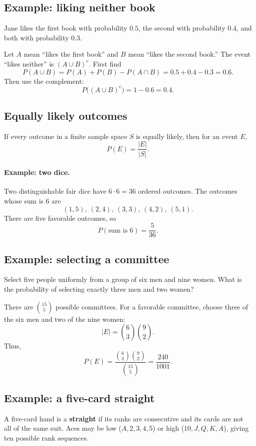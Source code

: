 \documentclass[11pt]{article}
\begin{document}
\subsection{Example: liking neither book}

Jane likes the first book with probability $0.5$, the second with
probability $0.4$, and both with probability $0.3$.

Let $A$ mean ``likes the first book'' and $B$ mean ``likes the
second book.'' The event ``likes neither'' is $(A\cup B)^c$.
First find
\[
P(A\cup B)=P(A)+P(B)-P(A\cap B)
=0.5+0.4-0.3=0.6.
\]
Then use the complement:
\[
\boxed{P\bigl((A\cup B)^c\bigr)=1-0.6=0.4.}
\]

\subsection{Equally likely outcomes}

If every outcome in a finite sample space $S$ is equally likely,
then for an event $E$,
\[
P(E)=\frac{|E|}{|S|}.
\]

\paragraph{Example: two dice.}
Two distinguishable fair dice have $6\cdot6=36$ ordered outcomes.
The outcomes whose sum is 6 are
\[
(1,5),\ (2,4),\ (3,3),\ (4,2),\ (5,1).
\]
There are five favorable outcomes, so
\[
\boxed{P(\text{sum is 6})=\frac{5}{36}.}
\]

\subsection{Example: selecting a committee}

Select five people uniformly from a group of six men and nine women.
What is the probability of selecting exactly three men and two women?

There are $\binom{15}{5}$ possible committees. For a favorable
committee, choose three of the six men and two of the nine women:
\[
|E|=\binom{6}{3}\binom{9}{2}.
\]
Thus,
\[
\boxed{
P(E)=\frac{\binom{6}{3}\binom{9}{2}}{\binom{15}{5}}
=\frac{240}{1001}.
}
\]

\subsection{Example: a five-card straight}

A five-card hand is a \textbf{straight} if its ranks are consecutive
and its cards are not all of the same suit. Aces may be low
($A,2,3,4,5$) or high ($10,J,Q,K,A$), giving ten possible rank
sequences.
\end{document}
